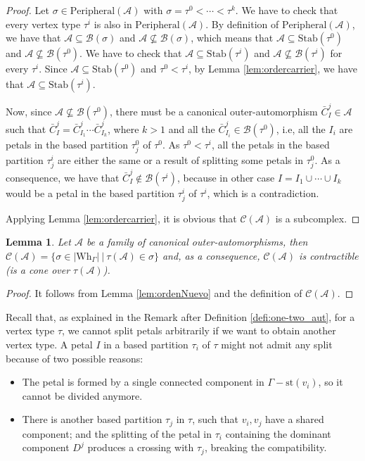 \documentclass[a4paper]{amsart}
\newcommand{\G}{\Gamma}
\newcommand{\B}{\mathcal{B}}
\newcommand{\au}{\mathcal{A}}
\newcommand{\Wh}{\mathrm{Wh}}
\newcommand{\st}{\mathrm{st}}
\newcommand{\peria}{\mathrm{Peripheral}(\au)}
\newcommand{\ca}{\mathcal{C}(\au)}
\newcommand{\Stab}{\mathrm{Stab}}
\newtheorem{lem}[teo]{Lemma}
\theoremstyle{definition}
\theoremstyle{remark}
\begin{document}
\begin{proof}
    Let $\sigma \in\peria$ with $\sigma=\tau^0<\cdots <\tau^k$. We have to check that every vertex type $\tau^i$ is also in $\peria$. By definition of $\peria$, we have that $\au\subseteq\B(\sigma)$ and $\au\nsubseteq\B(\sigma)$, which means that $\au\subseteq\Stab(\tau^0)$ and $\au\nsubseteq\B(\tau^0)$. We have to check that $\au\subseteq\Stab(\tau^i)$ and $\au\nsubseteq\B(\tau^i)$ for every $\tau^i$. Since $\au\subseteq\Stab(\tau^0)$ and $\tau^0<\tau^i$, by Lemma \ref{lem:ordercarrier}, we have that $\au\subseteq\Stab(\tau^i)$. 
    
    Now, since $\au\nsubseteq\B(\tau^0)$, there must be a canonical outer-automorphism $\bar{C}^j_I\in\au$ such that $\bar{C}^j_I=\bar{C}^j_{I_1}\cdots\bar{C}^j_{I_k}$, where $k>1$ and all the $\bar{C}^j_{I_i}\in\B(\tau^0)$, i.e, all the $I_i$ are petals in the based partition $\tau^0_j$ of $\tau^0$. As $\tau^0<\tau^i$, all the petals in the based partition  $\tau^i_j$ are either the same  or a result of splitting some petals in $\tau^0_j$. As a consequence, we have that $\bar{C}^j_{I}\notin\B(\tau^i)$, because in other case $I=I_1\cup\cdots\cup I_k$ would be a petal in the based partition $\tau^i_j$ of $\tau^i$, which is a contradiction.

    Applying Lemma \ref{lem:ordercarrier}, it is obvious that $\ca$ is a subcomplex.
\end{proof}
\begin{lem}
     Let $\au$ be a family of canonical outer-automorphisms, then $\ca=\{\sigma\in |\Wh_\G|\ |\ \tau(\au)\in\sigma\}$ and, as a consequence, $\ca$ is contractible (is a cone over $\tau(\au)$).
\end{lem}
\begin{proof}
    It follows from Lemma \ref{lem:ordenNuevo} and the definition of $
\mathcal{C}(\au)$.
\end{proof}


Recall that, as explained in the Remark after Definition \ref{defi:one-two_aut}, for a vertex type $\tau$, we cannot split  petals arbitrarily if we want to obtain another vertex type. A petal $I$ in a based partition $\tau_i$ of $\tau$ might not admit any split because of two possible reasons:
\begin{itemize}
    \item[a)] The petal is formed by a single connected component in $\G-\st(v_i)$, so it cannot be divided anymore.
    \item[b)] There is another based partition $\tau_j$  in  $\tau$, such that $v_i,v_j$ have a shared component; and the splitting of the petal in $\tau_i$ containing the dominant component $D^j$ produces a crossing with  $\tau_j$, breaking the compatibility. 
\end{itemize}
\end{document}
